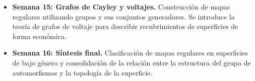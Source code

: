 \documentclass{article}
\begin{document}
\begin{itemize}
\begin{itemize}
             \item \textbf{Semana 15: Grafos de Cayley y voltajes.} Construcción de mapas regulares utilizando grupos y sus conjuntos generadores. Se introduce la teoría de grafos de voltaje para describir recubrimientos de superficies de forma económica.
             \item \textbf{Semana 16: Síntesis final.} Clasificación de mapas regulares en superficies de bajo género y consolidación de la relación entre la estructura del grupo de automorfismos y la topología de la superficie.
          \end{itemize}
    \end{itemize}

   \nocite{*}
   
   
\end{document}
